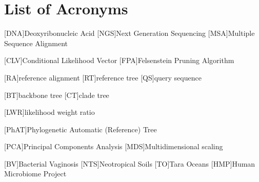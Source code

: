 \documentclass{wissdoc}
\author{\myname}
\title{\mytitle}
\begin{document}
\frontmatter
{}


\blankpage


\blankpage


\blankpage


\blankpage


{\parskip 0pt\tableofcontents}
\blankpage

{
\parskip 0pt
{}
\listoffigures
}
\blankpage

{
\parskip 0pt
{}
\listoftables
}
\blankpage


\chapter*{List of Acronyms}
\begin{acronym}

    [DNA]{Deoxyribonucleic Acid}
    [NGS]{Next Generation Sequencing}
    [MSA]{Multiple Sequence Alignment}

    [CLV]{Conditional Likelihood Vector}
    [FPA]{Felsenstein Pruning Algorithm}

    [RA]{reference alignment}
    [RT]{reference tree}
    [QS]{query sequence}

    [BT]{backbone tree}
    [CT]{clade tree}

    [LWR]{likelihood weight ratio}

    [PhAT]{Phylogenetic Automatic (Reference) Tree}

    [PCA]{Principal Components Analysis}
    [MDS]{Multidimensional scaling}

    [BV]{Bacterial Vaginosis}
    [NTS]{Neotropical Soils}
    [TO]{Tara Oceans}
    [HMP]{Human Microbiome Project}
\end{acronym}
\blankpage
\end{document}
